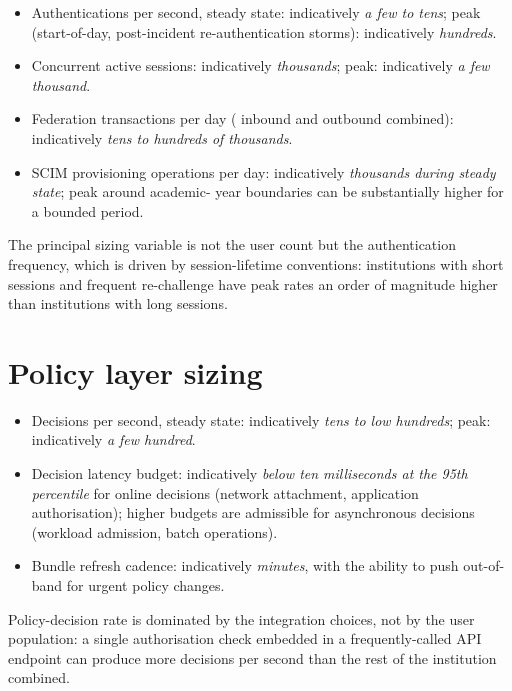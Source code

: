 \begin{itemize}[leftmargin=1.5em,nosep]
  \item Authentications per second, steady state: indicatively
    \emph{a few to tens}; peak (start-of-day, post-incident
    re-authentication storms): indicatively \emph{hundreds}.
  \item Concurrent active sessions: indicatively \emph{thousands};
    peak: indicatively \emph{a few thousand}.
  \item Federation transactions per day (
    inbound and outbound combined): indicatively \emph{tens to hundreds of
    thousands}.
  \item SCIM provisioning operations per day: indicatively
    \emph{thousands during steady state}; peak around academic-
    year boundaries can be substantially higher for a bounded
    period.
\end{itemize}

\noindent The principal sizing variable is not the user count but
the authentication frequency, which is driven by session-lifetime
conventions: institutions with short sessions and frequent
re-challenge have peak rates an order of magnitude higher than
institutions with long sessions.

\section{Policy layer sizing}
\label{sec:sz-policy}

\begin{itemize}[leftmargin=1.5em,nosep]
  \item Decisions per second, steady state: indicatively
    \emph{tens to low hundreds}; peak: indicatively \emph{a few
    hundred}.
  \item Decision latency budget: indicatively \emph{below ten
    milliseconds at the 95th percentile} for online decisions
    (network attachment, application authorisation); higher
    budgets are admissible for asynchronous decisions (workload
    admission, batch operations).
  \item Bundle refresh cadence: indicatively \emph{minutes}, with
    the ability to push out-of-band for urgent policy changes.
\end{itemize}

\noindent Policy-decision rate is dominated by the integration
choices, not by the user population: a single authorisation check
embedded in a frequently-called API endpoint can produce more
decisions per second than the rest of the institution combined.

